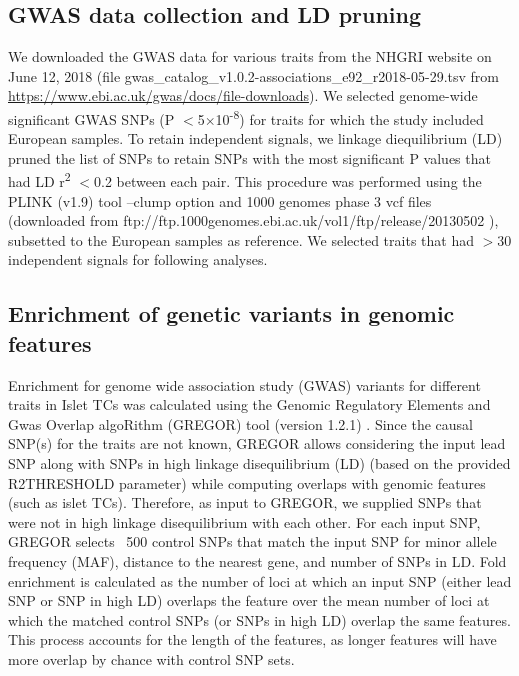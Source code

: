 \subsection{GWAS data collection and LD pruning} 
We downloaded the GWAS data for various traits from the NHGRI website on June 12, 2018 (file gwas\_catalog\_v1.0.2-associations\_e92\_r2018-05-29.tsv from \url{https://www.ebi.ac.uk/gwas/docs/file-downloads}). We selected genome-wide significant GWAS SNPs (P $<$5$\times$10\textsuperscript{-8}) for traits for which the study included European samples. To retain independent signals, we linkage diequilibrium (LD) pruned the list of SNPs to retain SNPs with the most significant P values that had LD r\textsuperscript{2} $<$0.2 between each pair. This procedure was performed using the PLINK (v1.9) tool \cite{purcellPLINKToolSet2007, changSecondgenerationPLINKRising2015}  –clump option and 1000 genomes phase 3 vcf files (downloaded from ftp://ftp.1000genomes.ebi.ac.uk/vol1/ftp/release/20130502 ), subsetted to the European samples as reference. We selected traits that had $>$30 independent signals for following analyses.        


\subsection{Enrichment of genetic variants in genomic features}
Enrichment for genome wide association study (GWAS) variants for different traits in Islet TCs was calculated using the Genomic Regulatory Elements and Gwas Overlap algoRithm (GREGOR) tool (version 1.2.1) \cite{schmidtGREGOREvaluatingGlobal2015}. Since the causal SNP(s) for the traits are not known, GREGOR allows considering the input lead SNP along with SNPs in high linkage disequilibrium (LD) (based on the provided R2THRESHOLD parameter) while computing overlaps with genomic features (such as islet TCs). Therefore, as input to GREGOR, we supplied SNPs that were not in high linkage disequilibrium with each other. For each input SNP, GREGOR selects ~500 control SNPs that match the input SNP for minor allele frequency (MAF), distance to the nearest gene, and number of SNPs in LD. Fold enrichment is calculated as the number of loci at which an input SNP (either lead SNP or SNP in high LD) overlaps the feature over the mean number of loci at which the matched control SNPs (or SNPs in high LD) overlap the same features. This process accounts for the length of the features, as longer features will have more overlap by chance with control SNP sets.                 


